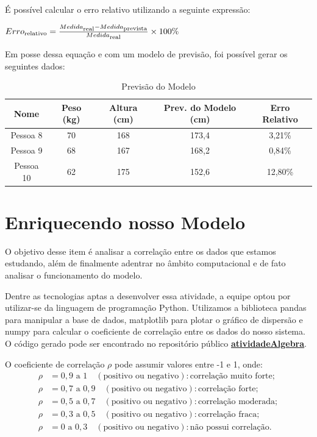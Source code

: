 \documentclass{article}
\begin{document}
    É possível calcular o erro relativo utilizando a seguinte expressão:
    \begin{center}
        $Erro\textsubscript{relativo} = \frac{Medida\textsubscript{real} - Medida\textsubscript{prevista}}{Medida\textsubscript{real}} \times 100\%$ \\
    \end{center}
    \newpage
    
    Em posse dessa equação e com um modelo de previsão, foi possível gerar os seguintes dados: 
    \begin{center}
        \begin{table}[ht]
        \begin{tabular}{|c|c|c|c|c|}
        \hline
        \textbf{Nome} & \textbf{Peso (kg)} & \textbf{Altura (cm)} & \textbf{Prev. do Modelo (cm)} & \textbf{Erro Relativo} \\
        \hline
            Pessoa 8 & 70 & 168  & 173,4 & 3,21\% \\
        \hline
            Pessoa 9 & 68 & 167  & 168,2 & 0,84\% \\
        \hline
            Pessoa 10 & 62 & 175 & 152,6 & 12,80\% \\
        \hline
        \end{tabular}
            \caption{Previsão do Modelo}
        \label{tab:treino}
        \end{table}
    \end{center}

\section{Enriquecendo nosso Modelo}
    O objetivo desse item é analisar a correlação entre os dados que estamos estudando, além de finalmente adentrar no âmbito computacional e de fato analisar o funcionamento do modelo.
    
    Dentre as tecnologias aptas a desenvolver essa atividade, a equipe optou por utilizar-se da linguagem de programação Python. Utilizamos a biblioteca pandas para manipular a base de dados, matplotlib para plotar o gráfico de dispersão e numpy para calcular o coeficiente de correlação entre os dados do nosso sistema. O código gerado pode ser encontrado no repositório público \textbf{\href{https://github.com/lucaasifx/atividadeAlgebra}{atividadeAlgebra}}.

    O coeficiente de correlação $\rho$ pode assumir valores entre -1 e 1, onde:
    \begin{align*}
        \rho &= 0,9 \text{ a } 1 \quad (\text{positivo ou negativo}): \text{correlação muito forte}; \\
        \rho &= 0,7 \text{ a } 0,9 \quad (\text{positivo ou negativo}): \text{correlação forte}; \\
        \rho &= 0,5 \text{ a } 0,7 \quad (\text{positivo ou negativo}): \text{correlação moderada}; \\
        \rho &= 0,3 \text{ a } 0,5 \quad (\text{positivo ou negativo}): \text{correlação fraca}; \\
        \rho &= 0 \text{ a } 0,3 \quad (\text{positivo ou negativo}): \text{não possui correlação}.
    \end{align*}
\end{document}
